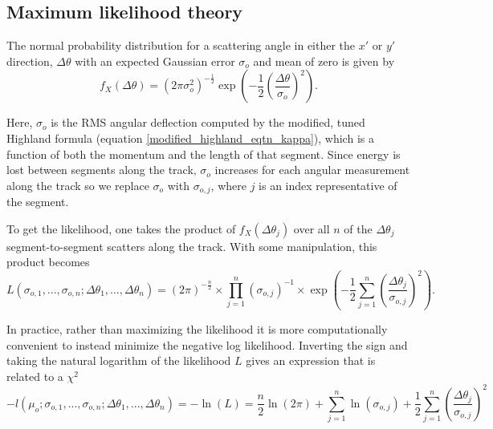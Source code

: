 \documentclass[a4paper,11pt]{article}
\begin{document}
\subsection{Maximum likelihood theory}\label{likelihood_theory_section}

The normal probability distribution for a scattering angle in either the $x'$ or $y'$ direction, $\Delta\theta$ with an expected Gaussian error $\sigma_o$ and mean of zero is given by
\begin{equation}
f_X(\Delta\theta) = (2\pi\sigma_o^2)^{-\frac{1}{2}}\exp(-\frac{1}{2}(\frac{\Delta\theta}{\sigma_o})^2).
\end{equation}

Here, $\sigma_o$ is the RMS angular deflection computed by the modified, tuned Highland formula (equation \ref{modified_highland_eqtn_kappa}), which is a function of both the momentum and the length of that segment. Since energy is lost between segments along the track, $\sigma_o$ increases for each angular measurement along the track so we replace $\sigma_o$ with $\sigma_{o,j}$, where $j$ is an index representative of the segment. \newline

To get the likelihood, one takes the product of $f_X(\Delta\theta_j)$ over all $n$ of the $\Delta\theta_j$ segment-to-segment scatters along the track. With some manipulation, this product becomes
\begin{equation}
L(\sigma_{o,1},...,\sigma_{o,n};\Delta\theta_1,...,\Delta\theta_n) = (2\pi)^{-\frac{n}{2}}\times\prod_{j=1}^{n}(\sigma_{o,j})^{-1} \times \exp(-\frac{1}{2}\sum_{j=1}^{n}(\frac{\Delta\theta_j}{\sigma_{o,j}})^2).
\end{equation}

In practice, rather than maximizing the likelihood it is more computationally convenient to instead minimize the negative log likelihood. Inverting the sign and taking the natural logarithm of the likelihood $L$ gives an expression that is related to a $\chi^2$
\begin{equation}\label{leo_llhd_eqtn}
-l(\mu_o;\sigma_{o,1},...,\sigma_{o,n};\Delta\theta_1,...,\Delta\theta_n) = -\ln(L) = \frac{n}{2}\ln(2\pi) + \sum_{j=1}^{n}\ln(\sigma_{o,j}) + \frac{1}{2}\sum_{j=1}^{n}(\frac{\Delta\theta_j}{\sigma_{o,j}})^2
\end{equation}

\end{document}
